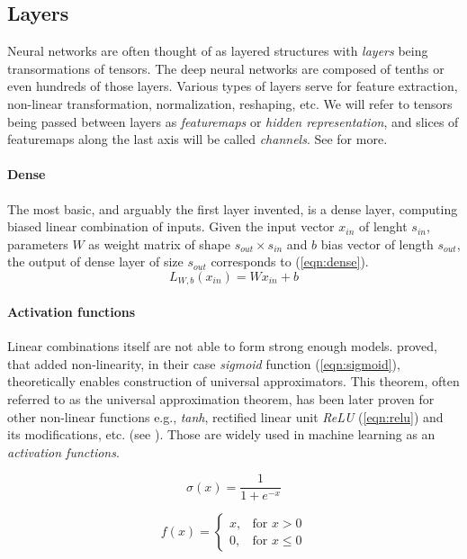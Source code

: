 \subsection{Layers}
\label{sec:layers}
Neural networks are often thought of as layered structures with \emph{layers} being transormations of tensors. The deep neural networks are composed of tenths or even hundreds of those layers. Various types of layers serve for feature extraction, non-linear transformation, normalization, reshaping, etc. We will refer to tensors being passed between layers as \emph{featuremaps} or \emph{hidden representation}, and slices of featuremaps along the last axis will be called \emph{channels}. See \cite{Goodfellow-et-al-2016} for more.

\paragraph{Dense}
The most basic, and arguably the first layer invented, is a dense layer, computing biased linear combination of inputs. Given the input vector $x_{in}$ of lenght $s_{in}$, parameters $W$ as weight matrix of shape $s_{out} \times s_{in}$ and $b$ bias vector of length $s_{out}$, the output of dense layer of size $s_{out}$ corresponds to (\ref{eqn:dense}).
\begin{equation} \label{eqn:dense}
L_{W, b}\left(x_{in}\right) = W x_{in} + b
\end{equation}

\paragraph{Activation functions}
Linear combinations itself are not able to form strong enough models. \cite{Cybenko1989} proved, that added non-linearity, in their case \emph{sigmoid} function (\ref{eqn:sigmoid}), theoretically enables construction of universal approximators. This theorem, often referred to as the universal approximation theorem, has been later proven for other non-linear functions e.g., \emph{tanh}, rectified linear unit \emph{ReLU} (\ref{eqn:relu}) and its modifications, etc. (see \cite{DBLP:journals/corr/SonodaM15}). Those are widely used in machine learning as an \emph{activation functions}.

\begin{equation} \label{eqn:sigmoid}
\sigma(x) = \frac{1}{1 + e^{-x}}
\end{equation}

\begin{equation} \label{eqn:relu}
f(x) =
\begin{cases}
    x, & \text{for } x > 0 \\
    0, & \text{for } x \leq 0
\end{cases}
\end{equation}


